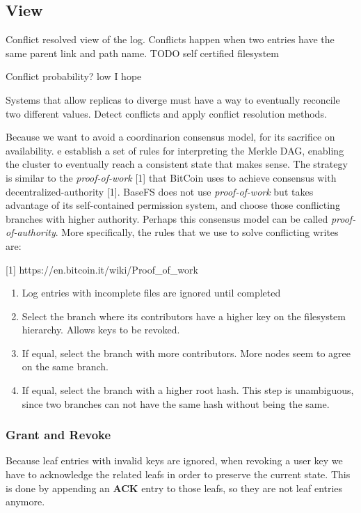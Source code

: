 \documentclass{sig-alternate}
\begin{document}
\subsection{View} \label{view}


Conflict resolved view of the log. Conflicts happen when two entries have the same parent link and path name.
 TODO self certified filesystem

Conflict probability? low I hope

Systems that allow replicas to diverge must have a way to eventually reconcile two different values. Detect conflicts and apply conflict resolution methods.

Because we want to avoid a coordinarion consensus model, for its sacrifice on availability. e establish a set of rules for interpreting the Merkle DAG, enabling the cluster to eventually reach a consistent state that makes sense. The strategy is similar to the \textit{proof-of-work} [1] that BitCoin uses to achieve consensus with decentralized-authority [1]. BaseFS does not use \textit{proof-of-work} but takes advantage of its self-contained permission system, and choose those conflicting branches with higher authority. Perhaps this consensus model can be called \textit{proof-of-authority}. More specifically, the rules that we use to solve conflicting writes are:

[1] https://en.bitcoin.it/wiki/Proof\_of\_work


\begin{enumerate}
\item Log entries with incomplete files are ignored until completed
\item Select the branch where its contributors have a higher key on the filesystem hierarchy. Allows keys to be revoked.
\item If equal, select the branch with more contributors. More nodes seem to agree on the same branch.
\item If equal, select the branch with a higher root hash. This step is unambiguous, since two branches can not have the same hash without being the same.
\end{enumerate}

\subsubsection{Grant and Revoke}
Because leaf entries with invalid keys are ignored, when revoking a user key we have to acknowledge the related leafs in order to preserve the current state. This is done by appending an \textbf{ACK} entry to those leafs, so they are not leaf entries anymore.
\end{document}
